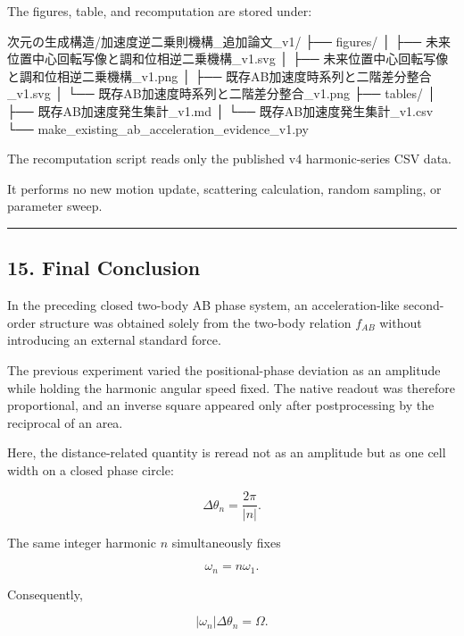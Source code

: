 \documentclass[
  10pt,
  a4paper,
]{article}
\newenvironment{Shaded}{}{}
\newcommand{\NormalTok}[1]{#1}
\begin{document}
The figures, table, and recomputation are stored under:

\begin{Shaded}
\begin{Highlighting}[]
\NormalTok{次元の生成構造/加速度逆二乗則機構\_追加論文\_v1/}
\NormalTok{├── figures/}
\NormalTok{│   ├── 未来位置中心回転写像と調和位相逆二乗機構\_v1.svg}
\NormalTok{│   ├── 未来位置中心回転写像と調和位相逆二乗機構\_v1.png}
\NormalTok{│   ├── 既存AB加速度時系列と二階差分整合\_v1.svg}
\NormalTok{│   └── 既存AB加速度時系列と二階差分整合\_v1.png}
\NormalTok{├── tables/}
\NormalTok{│   ├── 既存AB加速度発生集計\_v1.md}
\NormalTok{│   └── 既存AB加速度発生集計\_v1.csv}
\NormalTok{└── make\_existing\_ab\_acceleration\_evidence\_v1.py}
\end{Highlighting}
\end{Shaded}

The recomputation script reads only the published v4 harmonic-series CSV
data.

It performs no new motion update, scattering calculation, random
sampling, or parameter sweep.

\begin{center}\rule{0.5\linewidth}{0.5pt}\end{center}

\subsection{15. Final Conclusion}\label{final-conclusion}

In the preceding closed two-body AB phase system, an acceleration-like
second-order structure was obtained solely from the two-body relation
\(f_{AB}\) without introducing an external standard force.

The previous experiment varied the positional-phase deviation as an
amplitude while holding the harmonic angular speed fixed. The native
readout was therefore proportional, and an inverse square appeared only
after postprocessing by the reciprocal of an area.

Here, the distance-related quantity is reread not as an amplitude but as
one cell width on a closed phase circle:

\[
\Delta\theta_n=\frac{2\pi}{|n|}.
\]

The same integer harmonic \(n\) simultaneously fixes

\[
\omega_n=n\omega_1.
\]

Consequently,

\[
|\omega_n|\Delta\theta_n=\Omega.
\]
\end{document}
